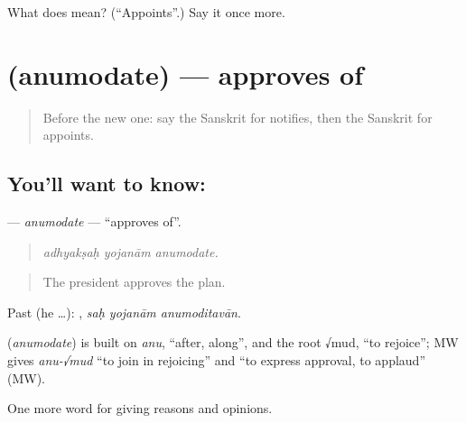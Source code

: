 \begin{tcolorbox}[breakable,colback=teal!4,colframe=teal!35!black,title={Before you move on}]
What does  mean? (\textquotedblleft{}Appoints\textquotedblright{}.) Say it once more.
\end{tcolorbox}
\section[\texorpdfstring{\sk{अनुमोदते} (anumodate)}{अनुमोदते (anumodate)}]{ (anumodate) — approves of}

\label{lesson:SA-C356-anumodate}



\begin{quote}
Before the new one: say the Sanskrit for notifies, then the Sanskrit for appoints.
\end{quote}

\subsection*{You'll want to know: }
\textbf{} — \emph{anumodate} — \textquotedblleft{}approves of\textquotedblright{}.

\begin{quote}
  
\end{quote}

\begin{quote}
\emph{adhyakṣaḥ yojanām anumodate.}
\end{quote}

\begin{quote}
The president approves the plan.
\end{quote}

Past (he …):   , \emph{saḥ yojanām anumoditavān}.

\begin{cousinweb}
\textbf{} (\emph{anumodate}) is built on \emph{anu}, \textquotedblleft{}after, along\textquotedblright{}, and the root √mud, \textquotedblleft{}to rejoice\textquotedblright{}; MW gives \emph{anu-√mud} \textquotedblleft{}to join in rejoicing\textquotedblright{} and \textquotedblleft{}to express approval, to applaud\textquotedblright{} (MW).
\end{cousinweb}

\begin{grammarlens}[title={What you've built}]
One more word for giving reasons and opinions.
\end{grammarlens}

